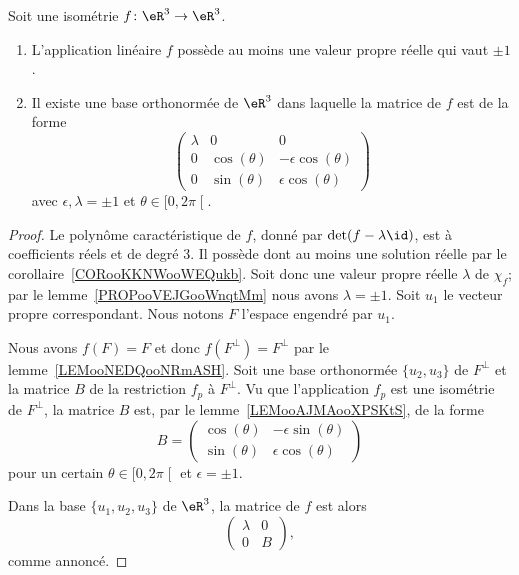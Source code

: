 \begin{proposition}      \label{PROPooOMORooWzsrDB}
    Soit une isométrie \( f\colon \eR^3\to \eR^3\).
    \begin{enumerate}
        \item
            L'application linéaire \( f\) possède au moins une valeur propre réelle qui vaut \( \pm 1\).
        \item
            Il existe une base orthonormée de \( \eR^3\) dans laquelle la matrice de \( f\) est de la forme
            \begin{equation}
                \begin{pmatrix}
                    \lambda    &   0    &   0    \\
                    0    &   \cos(\theta)    &   -\epsilon\cos(\theta)    \\
                    0    &   \sin(\theta)    &   \epsilon\cos(\theta)
                \end{pmatrix}
            \end{equation}
            avec \( \epsilon,\lambda=\pm 1\) et \( \theta\in \mathopen[ 0 , 2\pi \mathclose[\).
    \end{enumerate}
\end{proposition}

\begin{proof}
    Le polynôme caractéristique de \( f\), donné par \( \det(f-\lambda\id)\), est à coefficients réels et de degré \( 3\). Il possède dont au moins une solution réelle par le corollaire~\ref{CORooKKNWooWEQukb}. Soit donc une valeur propre réelle \( \lambda\) de \( \chi_f\); par le lemme~\ref{PROPooVEJGooWnqtMm} nous avons \( \lambda=\pm 1\). Soit \( u_1\) le vecteur propre correspondant. Nous notons \( F\) l'espace engendré par \( u_1\).

    Nous avons \( f(F)=F\) et donc \( f(F^{\perp})=F^{\perp}\) par le lemme~\ref{LEMooNEDQooNRmASH}. Soit une base orthonormée \( \{ u_2,u_3 \}\) de \( F^{\perp}\) et la matrice \( B\) de la restriction \( f_{p}\) à \( F^{\perp}\). Vu que l'application \( f_p\) est une isométrie de \( F^{\perp}\), la matrice \( B\) est, par le lemme~\ref{LEMooAJMAooXPSKtS}, de la forme
    \begin{equation}
        B=\begin{pmatrix}
            \cos(\theta)    &   -\epsilon\sin(\theta)    \\
            \sin(\theta)    &   \epsilon\cos(\theta)
        \end{pmatrix}
    \end{equation}
    pour un certain \( \theta\in\mathopen[ 0 , 2\pi \mathclose[\) et \( \epsilon=\pm 1\).

    Dans la base \( \{u_1,u_2,u_3\}\) de \( \eR^3\), la matrice de \( f\) est alors
    \begin{equation}
        \begin{pmatrix}
            \lambda    &   0    \\
            0    &   B
        \end{pmatrix},
    \end{equation}
    comme annoncé.
\end{proof}


